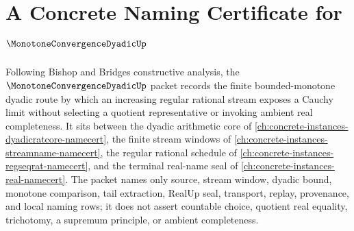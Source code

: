 \chapter{A Concrete Naming Certificate for $\MonotoneConvergenceDyadicUp$}
\label{ch:concrete-instances-monotone-convergence-dyadic-namecert}

Following Bishop and Bridges constructive analysis, the $\MonotoneConvergenceDyadicUp$ packet records the finite bounded-monotone dyadic route by which an increasing regular rational stream exposes a Cauchy limit without selecting a quotient representative or invoking ambient real completeness. It sits between the dyadic arithmetic core of \autoref{ch:concrete-instances-dyadicratcore-namecert}, the finite stream windows of \autoref{ch:concrete-instances-streamname-namecert}, the regular rational schedule of \autoref{ch:concrete-instances-regseqrat-namecert}, and the terminal real-name seal of \autoref{ch:concrete-instances-real-namecert}. The packet names only source, stream window, dyadic bound, monotone comparison, tail extraction, RealUp seal, transport, replay, provenance, and local naming rows; it does not assert countable choice, quotient real equality, trichotomy, a supremum principle, or ambient completeness.

